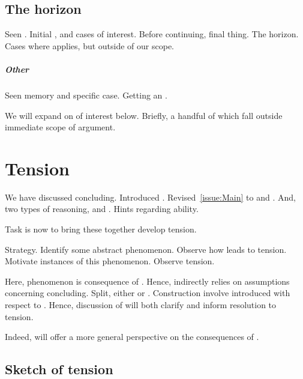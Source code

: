 \subsection{The horizon}

\begin{note}
  Seen \adB{}.
  Initial , and cases of interest.
  Before continuing,  final thing.
  The horizon.
  Cases where \adB{} applies, but outside of our scope.
\end{note}

\subparagraph{Other }

\begin{note}
  Seen memory and specific case.
  Getting an \itp{}.

  We will expand on  of interest below.
  Briefly, a handful of  which fall outside immediate scope of argument.
\end{note}

\section{Tension}
\label{sec:tension}

\begin{note}[Intro]
  We have discussed concluding.
  Introduced \csN{}.
  Revised~\autoref{issue:Main} to \ESU{} and \EAS{}.
  And, two types of reasoning, \adA{} and \adB{}.
  Hints regarding ability.

  Task is now to bring these together develop tension.
\end{note}

\begin{note}
  Strategy.
  Identify some abstract phenomenon.
  Observe how leads to tension.
  Motivate instances of this phenomenon.
  Observe tension.

  Here, phenomenon is consequence of \csN{}.
  Hence, indirectly relies on assumptions concerning concluding.
  Split, either \ESU{} or \EAS{}.
  Construction involve \itp{} introduced with respect to \adB{}.
  Hence, discussion of \adB{} will both clarify and inform resolution to tension.

  Indeed, \adB{} will offer a more general perspective on the consequences of \csN{}.
\end{note}

\subsection{Sketch of tension}
\label{sec:overview-tension}

